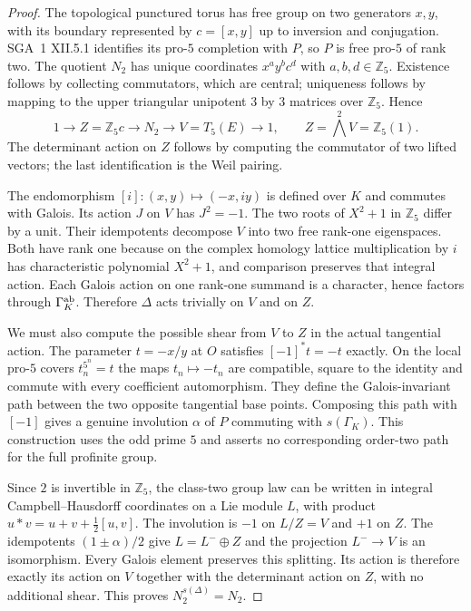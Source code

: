\documentclass[11pt,a4paper]{article}
\begin{document}
\begin{proof}
The topological punctured torus has free group on two generators $x,y$, with its boundary represented by $c=[x,y]$ up to inversion and conjugation. SGA~1 XII.5.1 identifies its pro-$5$ completion with $P$, so $P$ is free pro-$5$ of rank two. The quotient $N_2$ has unique coordinates $x^a y^b c^d$ with $a,b,d\in\mathbb Z_5$. Existence follows by collecting commutators, which are central; uniqueness follows by mapping to the upper triangular unipotent $3$ by $3$ matrices over $\mathbb Z_5$. Hence
\[
 1\longrightarrow Z=\mathbb Z_5c\longrightarrow N_2
 \longrightarrow V=T_5(E)\longrightarrow1,
 \qquad Z=\bigwedge^2V=\mathbb Z_5(1).
\]
The determinant action on $Z$ follows by computing the commutator of two lifted vectors; the last identification is the Weil pairing.

The endomorphism $[i]:(x,y)\mapsto(-x,iy)$ is defined over $K$ and commutes with Galois. Its action $J$ on $V$ has $J^2=-1$. The two roots of $X^2+1$ in $\mathbb Z_5$ differ by a unit. Their idempotents decompose $V$ into two free rank-one eigenspaces. Both have rank one because on the complex homology lattice multiplication by $i$ has characteristic polynomial $X^2+1$, and comparison preserves that integral action. Each Galois action on one rank-one summand is a character, hence factors through $\Gamma_K^{\rm ab}$. Therefore $\Delta$ acts trivially on $V$ and on $Z$.

We must also compute the possible shear from $V$ to $Z$ in the actual tangential action. The parameter $t=-x/y$ at $O$ satisfies $[-1]^*t=-t$ exactly. On the local pro-$5$ covers $t_n^{5^n}=t$ the maps $t_n\mapsto-t_n$ are compatible, square to the identity and commute with every coefficient automorphism. They define the Galois-invariant path between the two opposite tangential base points. Composing this path with $[-1]$ gives a genuine involution $\alpha$ of $P$ commuting with $s(\Gamma_K)$. This construction uses the odd prime $5$ and asserts no corresponding order-two path for the full profinite group.

Since $2$ is invertible in $\mathbb Z_5$, the class-two group law can be written in integral Campbell--Hausdorff coordinates on a Lie module $L$, with product $u*v=u+v+\tfrac12[u,v]$. The involution is $-1$ on $L/Z=V$ and $+1$ on $Z$. The idempotents $(1\pm\alpha)/2$ give $L=L^-\oplus Z$ and the projection $L^-\to V$ is an isomorphism. Every Galois element preserves this splitting. Its action is therefore exactly its action on $V$ together with the determinant action on $Z$, with no additional shear. This proves $N_2^{s(\Delta)}=N_2$.


\end{proof}
\end{document}
